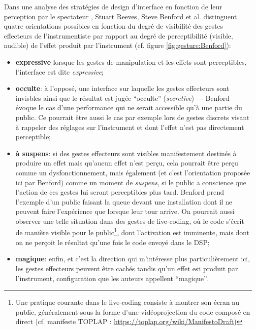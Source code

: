 \noindent Dans une analyse des stratégies de design d'interface en fonction de leur perception par le spectateur \cite{reeves_designing_2005}, Stuart Reeves, Steve Benford et al. distinguent quatre orientations possibles en fonction du degré de visibilité des gestes effecteurs de l'instrumentiste par rapport au degré de perceptibilité (visible, audible) de l'effet produit par l'instrument (cf. figure \ref{fig:gesture:Benford}):
\vspace{-1em}
\begin{itemize}[noitemsep]
 	\item \textbf{expressive} lorsque les gestes de manipulation et les effets sont perceptibles, l'interface est dite \textit{expressive}; 
 	\item \textbf{occulte}: à l'opposé, une interface sur laquelle les gestes effecteurs sont invisbles ainsi que le résultat est jugée ``occulte'' (\textit{secretive}) — Benford évoque le cas d'une performance qui ne serait accessible qu'à une partie du public. Ce pourrait être aussi le cas par exemple lors de gestes discrets visant à rappeler des réglages sur l'instrument et dont l'effet n'est pas directement perceptible; 
 	\item \textbf{à suspens}: si des gestes effecteurs sont visibles manifestement destinés à produire un effet mais qu'aucun effet n'est perçu, cela pourrait être perçu comme un dysfonctionnement, mais également (et c'est l'orientation proposée ici par Benford) comme un moment de \textit{suspens}, si le public a conscience que l'action de ces gestes lui seront perceptibles plus tard. Benford prend l'exemple d'un public faisant la queue devant une installation dont il ne peuvent faire l'expérience que lorsque leur tour arrive. On pourrait aussi observer une telle situation dans des gestes de live-coding, où le code s'écrit de manière visible pour le public\footnote{Une pratique courante dans le live-coding consiste à montrer son écran au public, généralement sous la forme d'une vidéoprojection du code composé en direct (cf. manifeste TOPLAP : \url{https://toplap.org/wiki/ManifestoDraft})}, dont l'activation est imminente, mais dont on ne perçoit le résultat qu'une fois le code envoyé dans le \gls{DSP};
 	\item \textbf{magique}: enfin, et c'est la direction qui m'intéresse plus particulièrement ici, les gestes effecteurs peuvent être cachés tandis qu'un effet est produit par l'instrument, configuration que les auteurs appellent ``magique''.
\end{itemize}

